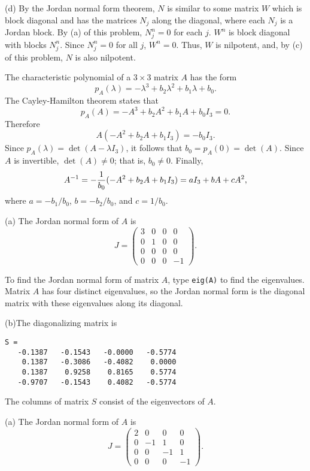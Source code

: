 (d) By the Jordan normal form theorem, $N$ is similar to some matrix $W$ which
is block diagonal and has the matrices $N_j$ along the diagonal, where each
$N_j$ is a Jordan block.  By (a) of this problem, $N_j^n = 0$ for each
$j$.  $W^n$ is block diagonal with blocks $N_j^n$.  Since $N_j^n = 0$ for all
$j$, $W^n = 0$.  Thus, $W$ is nilpotent, and, by (c) of this problem, $N$
is also nilpotent.

The characteristic polynomial of a $3\times 3$ matrix $A$ has the form 
\[
p_A(\lambda) = -\lambda^3 + b_2\lambda^2 + b_1\lambda + b_0.
\]
The Cayley-Hamilton theorem states that 
\[
p_A(A) = -A^3 + b_2A^2 + b_1A + b_0I_3 = 0.
\]
Therefore
\[
A(-A^2 +b_2A +b_1I_3) = -b_0I_3.
\]
Since $p_A(\lambda) =\det(A-\lambda I_3)$, it follows that $b_0=p_A(0)=\det(A)$.
Since $A$ is invertible, $\det(A)\neq 0$; that is, $b_0\neq 0$.  Finally, 
\[
A^{-1} = -\frac{1}{b_0}(-A^2+b_2A+b_1I_3) = aI_3 + bA + cA^2,
\]
where $a = -b_1/b_0$, $b = -b_2/b_0$, and $c=1/b_0$.



(a) \ans The Jordan normal form of $A$ is
\[
J = \left(\begin{array}{rrrr}
3 & 0 & 0 & 0 \\
0 & 1 & 0 & 0 \\
0 & 0 & 0 & 0 \\
0 & 0 & 0 & -1 \end{array}\right).
\]

\soln
To find the Jordan normal form of matrix $A$, type {\tt eig(A)} to find
the eigenvalues.  Matrix $A$ has four distinct eigenvalues, so the
Jordan normal form is the diagonal matrix with these eigenvalues along
its diagonal.  

(b)\ans   The diagonalizing matrix is
\begin{verbatim}
S =
   -0.1387   -0.1543   -0.0000   -0.5774
    0.1387   -0.3086   -0.4082    0.0000
    0.1387    0.9258    0.8165    0.5774
   -0.9707   -0.1543    0.4082   -0.5774
\end{verbatim}

\soln The columns of matrix $S$ consist of the eigenvectors of $A$.


(a) \ans The Jordan normal form of $A$ is
\[
J = \left(\begin{array}{rrrr}
2 & 0 & 0 & 0 \\
0 & -1 & 1 & 0 \\
0 & 0 & -1 & 1 \\
0 & 0 & 0 & -1 \end{array}\right).
\]

